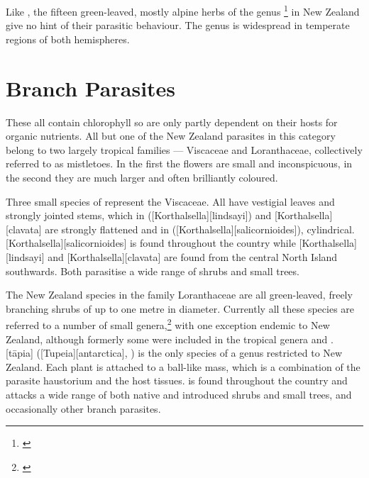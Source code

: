 Like , the fifteen green-leaved, mostly alpine herbs of the genus \footnote{\cite{philipson1959some}} in New Zealand give no hint of their parasitic behaviour.
The genus is widespread in temperate regions of both hemispheres.

\section{Branch Parasites}

These all contain chlorophyll so are only partly dependent on their hosts for organic nutrients.
All but one of the New Zealand parasites in this category belong to two largely tropical families --- Viscaceae and Loranthaceae, collectively referred to as mistletoes.
In the first the flowers are small and inconspicuous, in the second they are much larger and often brilliantly coloured.

Three small species of  represent the Viscaceae.
All have vestigial leaves and strongly jointed stems, which in  ([Korthalsella][lindsayi]) and [Korthalsella][clavata] are strongly flattened and in  ([Korthalsella][salicornioides]), cylindrical.
[Korthalsella][salicornioides] is found throughout the country while [Korthalsella][lindsayi] and [Korthalsella][clavata] are found from the central North Island southwards.
Both parasitise a wide range of shrubs and small trees.

The New Zealand species in the family Loranthaceae are all green-leaved, freely branching shrubs of up to one metre in diameter.
Currently all these species are referred to a number of small genera,\footnote{\cite{barlow1966revision}} with one exception endemic to New Zealand, although formerly some were included in the tropical genera  and .
[tāpia] ([Tupeia][antarctica], ) is the only species of a genus restricted to New Zealand.
Each plant is attached to a ball-like mass, which is a combination of the parasite haustorium and the host tissues.
 is found throughout the country and attacks a wide range of both native and introduced shrubs and small trees, and occasionally other branch parasites.

